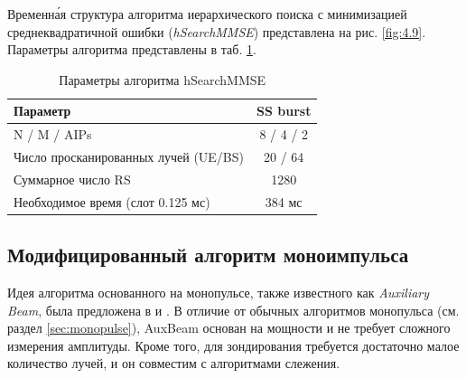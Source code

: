 Временн\'{а}я структура алгоритма иерархического поиска с минимизацией
среднеквадратичной ошибки (\textit{hSearchMMSE}) представлена на рис. \ref{fig:4.9}.
Параметры алгоритма представлены в таб. \ref{tab:4.3}.
\begin{table}
    \centering
    \caption{Параметры алгоритма hSearchMMSE}
    \label{tab:4.3}
    \begin{tabular}{|l|c|}
        \hline
        Параметр                             & SS burst  \\
        \hline
        N / M / AIPs                         & 8 / 4 / 2 \\
        Число просканированных лучей (UE/BS) & 20 / 64   \\
        Суммарное число RS                   & 1280      \\
        Необходимое время (слот 0.125 мс)    & 384 мс    \\
        \hline
    \end{tabular}
\end{table}

\subsection{Модифицированный алгоритм моноимпульса}
Идея алгоритма основанного на монопульсе, также известного как \textit{Auxiliary Beam}, была
предложена в \cite{Zhu2016} и \cite{Kim2019}. В отличие от обычных алгоритмов
монопульса (см. раздел \ref{sec:monopulse}), AuxBeam основан на мощности и не
требует сложного измерения амплитуды. Кроме того, для зондирования требуется
достаточно малое количество лучей, и он совместим с алгоритмами слежения. 

